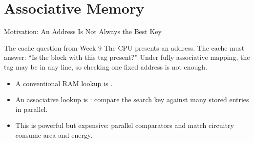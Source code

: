 \documentclass[aspectratio=169]{beamer}
\begin{document}

\section{Associative Memory}

\begin{frame}{Motivation: An Address Is Not Always the Best Key}
  \begin{exampleblock}{The cache question from Week 9}
    The CPU presents an address. The cache must answer: ``Is the block with
    this tag present?'' Under fully associative mapping, the tag may be in
    any line, so checking one fixed address is not enough.
  \end{exampleblock}
  \begin{itemize}
    \item A conventional RAM lookup is .
    \item An associative lookup is :
      compare the search key against many stored entries in parallel.
    \item This is powerful but expensive: parallel comparators and match
      circuitry consume area and energy.
  \end{itemize}
\end{frame}
\end{document}
